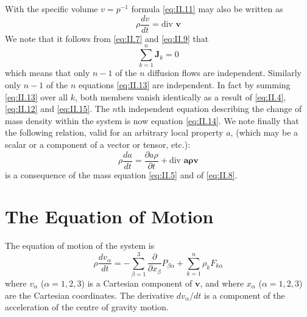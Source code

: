 With the specific volume $v = p^{-1}$ formula \eqref{eq:II.11} may also be written as
\begin{equation}
    \rho \frac{d v}{d t} = \textrm{div } \bm{v}
    \label{eq:II.14}
\end{equation}
We note that it follows from \eqref{eq:II.7} and \eqref{eq:II.9} that
\begin{equation}
\sum_{k=1}^{n} \bm{J}_k = 0
    \label{eq:II.15}
\end{equation}
which means that only $n-1$ of the $n$ diffusion flows are independent.
Similarly only $n-1$ of the $n$ equations \eqref{eq:II.13} are independent. In fact by summing \eqref{eq:II.13} over all $k$, both members vanish identically as a result of \eqref{eq:II.4}, \eqref{eq:II.12} and \eqref{eq:II.15}. The $n$th independent equation describing the change of mass density within the system is now equation \eqref{eq:II.14}.
We note finally that the following relation, valid for an arbitrary
local property $a$, (which may be a scalar or a component of a vector or
tensor, etc.):
\begin{equation}
\rho \frac{d a}{d t} = \frac{\partial a \rho}{\partial t} + \textrm{div } \bm{a \rho v}
    \label{eq:II.16}
\end{equation}
is a consequence of the mass equation \eqref{eq:II.5} and of \eqref{eq:II.8}.

\section{The Equation of Motion}
The equation of motion of the system is
\begin{equation}
\rho \frac{d v_{\alpha}}{d t} = - \sum_{\beta=1}^{3} \frac{\partial}{\partial x_{\beta}} P_{\beta \alpha} + \sum_{k=1}^{n} \rho_k F_{k \alpha}
    \label{eq:II.17}
\end{equation}
where $v_{\alpha}$ ($\alpha = 1,2,3$) is a Cartesian component of $\bm{v}$, and where $x_{\alpha}$ ($\alpha = 1,2,3$) are the Cartesian coordinates. The derivative $d v_{\alpha} / dt$ is a component of the acceleration of the centre of gravity motion.

